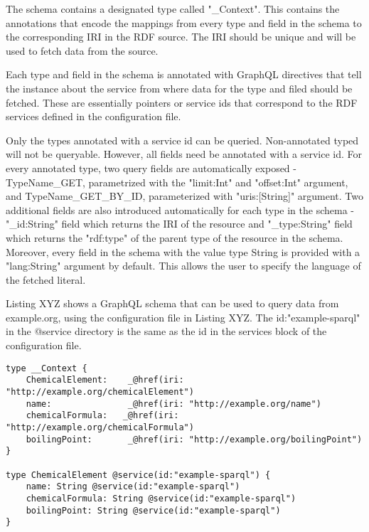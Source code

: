 The schema contains a designated type called "\_Context". This contains the annotations that encode the mappings from every type and field in the schema to the corresponding IRI in the RDF source. The IRI should be unique and will be used to fetch data from the source. 

Each type and field in the schema is annotated with GraphQL directives that tell the instance about the service from where data for the type and filed should be fetched. These are essentially pointers or service ids that correspond to the RDF services defined in the configuration file.

Only the types annotated with a service id can be queried. Non-annotated typed will not be queryable. However, all fields need be annotated with a service id. For every annotated type, two query fields are automatically exposed - TypeName\_GET, parametrized with the "limit:Int" and "offset:Int" argument, and TypeName\_GET\_BY\_ID, parameterized with "uris:[String]" argument. Two additional fields are also introduced automatically for each type in the schema - "\_id:String" field which returns the IRI of the resource and "\_type:String" field which returns the "rdf:type" of the parent type of the resource in the schema. Moreover, every field in the schema with the value type String is provided with a "lang:String" argument by default. This allows the user to specify the language of the fetched literal.

Listing XYZ shows a GraphQL schema that can be used to query data from example.org, using the configuration file in Listing XYZ. The id:"example-sparql" in the @service directory is the same as the id in the services block of the configuration file.


\begin{minipage}{\linewidth}
\begin{lstlisting}[label=listing:listing14, caption={An example schema}]
type __Context {
    ChemicalElement:    _@href(iri: "http://example.org/chemicalElement")
    name:               _@href(iri: "http://example.org/name")
    chemicalFormula:   _@href(iri: "http://example.org/chemicalFormula")
    boilingPoint:       _@href(iri: "http://example.org/boilingPoint")
}

type ChemicalElement @service(id:"example-sparql") {
    name: String @service(id:"example-sparql")
    chemicalFormula: String @service(id:"example-sparql")
    boilingPoint: String @service(id:"example-sparql")
}
\end{lstlisting}
\end{minipage}

